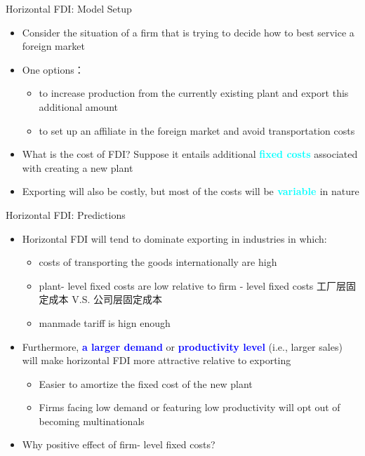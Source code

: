 \documentclass[10pt,hyperref={CJKbookmarks=true},xcolor=dvipsnames,aspectratio=169]{beamer}
\begin{document}
\begin{frame}{Horizontal FDI: Model Setup}

\begin{itemize}
\item Consider the situation of a firm that is trying to decide how to best
service a foreign market 
\item One options：

\begin{itemize}
\item to increase production from the currently existing plant and export
this additional amount 
\item to set up an affiliate in the foreign market and avoid transportation
costs 
\end{itemize}
\item What is the cost of FDI? Suppose it entails additional \textbf{\textcolor{cyan}{fixed
costs}} associated with creating a new plant 
\item Exporting will also be costly, but most of the costs will be\textbf{\textcolor{cyan}{{}
variable }}in nature 
\end{itemize}
\end{frame}

\begin{frame}{Horizontal FDI: Predictions }

\begin{itemize}
\item Horizontal FDI will tend to dominate exporting in industries in which: 

\begin{itemize}
\item costs of transporting the goods internationally are high 
\item plant- level fixed costs are low relative to firm - level fixed costs
工厂层固定成本 V.S. 公司层固定成本
\item manmade tariff is hign enough
\end{itemize}
\item Furthermore, \textbf{\textcolor{blue}{a larger demand}} or \textbf{\textcolor{blue}{productivity
level}} (i.e., larger sales) will make horizontal FDI more attractive
relative to exporting 

\begin{itemize}
\item Easier to amortize the fixed cost of the new plant 
\item Firms facing low demand or featuring low productivity will opt out
of becoming multinationals 
\end{itemize}
\item Why positive effect of firm- level fixed costs? 
\end{itemize}
\end{frame}
\end{document}
